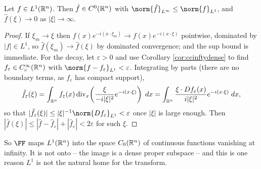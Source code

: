 \documentclass[a4paper]{scrartcl}
\begin{document}
\begin{lemma}\label{lem:riemannlebesgue}
	Let $f \in L^1(\mathbb{R}^n)$. Then $\hat f \in C^0(\mathbb{R}^n)$ with $\norm{\hat f}_{L^\infty}\le\norm{f}_{L^1}$, and $\hat f(\xi)\to 0$ as $|\xi|\to\infty$.
\end{lemma}

\begin{proof}
	If $\xi_m \to \xi$ then $f(x)e^{-i(x\cdot\xi_m)}\to f(x)e^{-i(x\cdot\xi)}$ pointwise, dominated by $|f| \in L^1$, so $\hat f(\xi_m)\to\hat f(\xi)$ by dominated convergence; and the sup bound is immediate. For the decay, let $\varepsilon > 0$ and use Corollary \ref{cor:ccinftydense} to find $f_\varepsilon \in C_c^\infty(\mathbb{R}^n)$ with $\norm{f - f_\varepsilon}_{L^1}<\varepsilon$. Integrating by parts (there are no boundary terms, as $f_\varepsilon$ has compact support),
	$$\hat f_\varepsilon(\xi) = \int_{\mathbb{R}^n} f_\varepsilon(x) \operatorname{div}_x\!\left( \frac{\xi}{-i|\xi|^2}e^{-i(x\cdot\xi)}\right) \; d x = \int_{\mathbb{R}^n}\frac{\xi \cdot Df_\varepsilon(x)}{i|\xi|^2}e^{-i(x\cdot\xi)}\; d x,$$
	so that $|\hat f_\varepsilon(\xi)|\le |\xi|^{-1}\norm{Df_\varepsilon}_{L^1} < \varepsilon$ once $|\xi|$ is large enough. Then $|\hat f(\xi)|\le|\hat f - \hat f_\varepsilon|+|\hat f_\varepsilon| < 2\varepsilon$ for such $\xi$.
\end{proof}

So $\FF$ maps $L^1(\mathbb{R}^n)$ into the space $C_0(\mathbb{R}^n)$ of continuous functions vanishing at infinity. It is not onto -- the image is a dense proper subspace -- and this is one reason $L^1$ is not the natural home for the transform.
\end{document}
